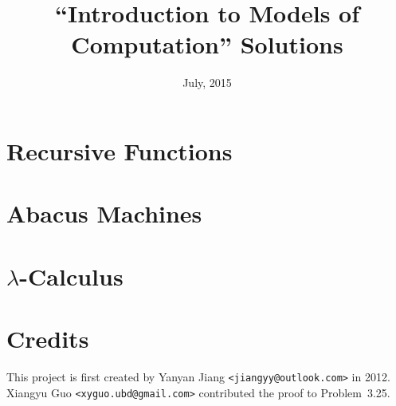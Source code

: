 \documentclass[11pt]{article}
\title{\bf ``Introduction to Models of Computation'' Solutions}
\date{July, 2015}
\begin{document}
\maketitle

\tableofcontents

\clearpage

\section{Recursive Functions}



























\section{Abacus Machines}







\section{$\lambda$-Calculus}



























\section{Credits}

This project is first created by Yanyan Jiang \texttt{<jiangyy@outlook.com>} in 2012.
Xiangyu Guo \texttt{<xyguo.ubd@gmail.com>} contributed the proof to Problem~3.25.

\newpage
\end{document}
